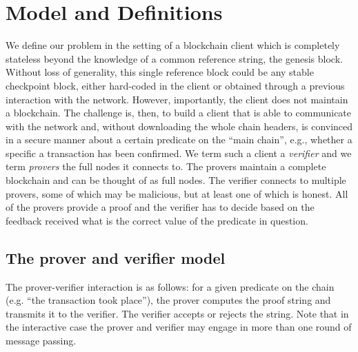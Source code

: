 \section{Model and Definitions}
\label{sec.model}

We define our problem in the setting of a blockchain client which is completely
stateless beyond the knowledge of a common reference string, the genesis block.
Without loss of generality, this single reference block could be any stable
checkpoint block, either hard-coded in the client or obtained through a previous
interaction with the network. However, importantly, the client does not maintain
a blockchain. The challenge is, then, to build a client that is able to
communicate with the network and, without downloading the whole chain headers,
is convinced in a secure manner about a certain predicate on the ``main chain'', e.g., whether a specific a transaction has been confirmed. We term such
a client a \textit{verifier} and we term \textit{provers} the full nodes it
connects to.
%
The provers maintain a complete blockchain and can be thought of as full nodes.
The verifier connects to multiple provers, some of which may be malicious, but
at least one of which is honest. All of the provers provide a proof and the
verifier has to decide based on the feedback received what is the
correct value of the predicate in question.

\subsection{The prover and verifier model}

The prover-verifier interaction is as follows: for a given predicate on the chain (e.g. ``the transaction took place''), the
prover computes the proof string and transmits it to the verifier. The verifier
accepts or rejects the string.
Note that in the interactive case the prover and verifier may engage in more than one round of message passing.

